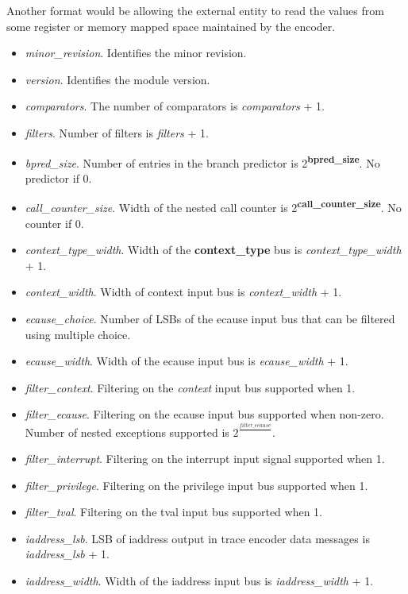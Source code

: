 Another format would be allowing the external entity to read the
values from some register or memory mapped space maintained by the
encoder.

\begin{itemize}
    \item \textit{minor\_revision}. Identifies the minor revision.
    \item \textit{version}. Identifies the module version.
    \item \textit{comparators}. The number of comparators is \textit{comparators} + 1.
    \item \textit{filters}. Number of filters is \textit{filters} + 1.
    \item \textit{bpred\_size}. Number of entries in the branch predictor is 2\textsuperscript{\textbf{bpred\_size}}.  No predictor if 0.
    \item \textit{call\_counter\_size}. Width of the nested call counter is 2\textsuperscript{\textbf{call\_counter\_size}}.  No counter if 0.
    \item \textit{context\_type\_width}. Width of the \textbf{context\_type} bus is \textit{context\_type\_width} + 1.
    \item \textit{context\_width}. Width of context input bus is \textit{context\_width} + 1.
    \item \textit{ecause\_choice}. Number of LSBs of the ecause input bus that can be filtered using multiple choice.
    \item \textit{ecause\_width}. Width of the ecause input bus is \textit{ecause\_width} + 1.
    \item \textit{filter\_context}. Filtering on the \textit{context} input bus supported when 1.
    \item \textit{filter\_ecause}. Filtering on the ecause input bus supported when non-zero.  Number of nested exceptions supported is $2^\frac{\textit {filter\_ecause}}{}$.
    \item \textit{filter\_interrupt}. Filtering on the interrupt input signal supported when 1.
    \item \textit{filter\_privilege}. Filtering on the privilege input bus supported when 1.
    \item \textit{filter\_tval}. Filtering on the tval input bus supported when 1.
    \item \textit{iaddress\_lsb}. LSB of iaddress output in trace encoder data messages is \textit{iaddress\_lsb} + 1.
    \item \textit{iaddress\_width}. Width of the iaddress input bus is \textit{iaddress\_width} + 1.

\end{itemize}
